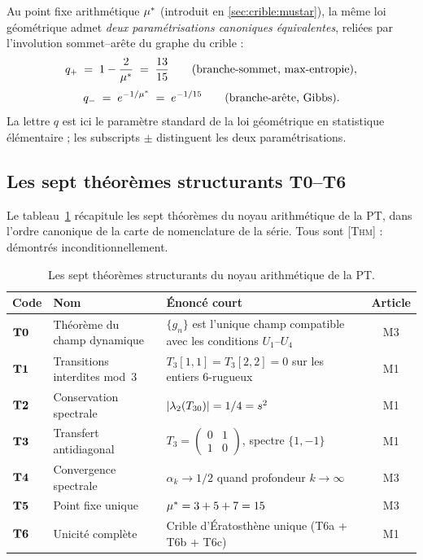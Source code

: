 Au point fixe arithmétique $\mu^{*}$ (introduit en \ref{sec:crible:mustar}), la même loi géométrique admet \emph{deux paramétrisations canoniques équivalentes}, reliées par l'involution sommet--arête du graphe du crible :
\begin{equation}
q_{+} \;=\; 1 - \dfrac{2}{\mu^{*}} \;=\; \dfrac{13}{15}
\qquad\text{(branche-sommet, max-entropie)},
\label{eq:qplus}
\end{equation}
\begin{equation}
q_{-} \;=\; e^{-1/\mu^{*}} \;=\; e^{-1/15}
\qquad\text{(branche-arête, Gibbs)}.
\label{eq:qminus}
\end{equation}
La lettre $q$ est ici le paramètre standard de la loi géométrique en statistique élémentaire ; les subscripts $\pm$ distinguent les deux paramétrisations.

\subsection{Les sept théorèmes structurants T0--T6}
\label{sec:crible:Tn}

Le tableau~\ref{tab:Tn} récapitule les sept théorèmes du noyau arithmétique de la PT, dans l'ordre canonique de la carte de nomenclature de la série. Tous sont \textsc{[Thm]} : démontrés inconditionnellement.

\begin{table}[htbp]
\centering
\small
\begin{tabular}{@{}lp{5cm}p{5cm}c@{}}
\toprule
Code & Nom & Énoncé court & Article \\
\midrule
$\textbf{T0}$ & Théorème du champ dynamique & $\{g_n\}$ est l'unique champ compatible avec les conditions $U_1$--$U_4$ & M3 \\
$\textbf{T1}$ & Transitions interdites mod~3 & $T_3[1,1] = T_3[2,2] = 0$ sur les entiers 6-rugueux & M1 \\
$\textbf{T2}$ & Conservation spectrale & $|\lambda_2(T_{30})| = 1/4 = s^{2}$ & M1 \\
$\textbf{T3}$ & Transfert antidiagonal & $T_3 = \begin{pmatrix} 0 & 1 \\ 1 & 0 \end{pmatrix}$, spectre $\{1,-1\}$ & M1 \\
$\textbf{T4}$ & Convergence spectrale & $\alpha_k \to 1/2$ quand profondeur $k \to \infty$ & M3 \\
$\textbf{T5}$ & Point fixe unique & $\mu^{*} = 3 + 5 + 7 = 15$ & M3 \\
$\textbf{T6}$ & Unicité complète & Crible d'Ératosthène unique (T6a + T6b + T6c) & M1 \\
\bottomrule
\end{tabular}
\caption{Les sept théorèmes structurants du noyau arithmétique de la PT.}
\label{tab:Tn}
\end{table}

